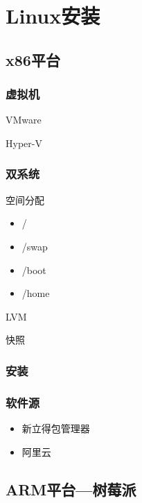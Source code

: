 \chapter{Linux安装}
	\section{x86平台}
		\subsection{虚拟机}
			\par VMware
			\par Hyper-V
		\subsection{双系统}
			\par 空间分配
			\begin{itemize}
				\item /
				\item /swap
				\item /boot
				\item /home
			\end{itemize}
			\par LVM
			\par 快照
		\subsection{安装}
		\subsection{软件源}
			\begin{itemize}
				\item 新立得包管理器
				\item 阿里云
			\end{itemize}
	\section{ARM平台---树莓派}

